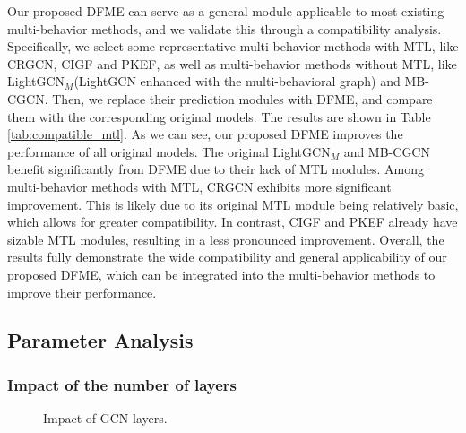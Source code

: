 Our proposed DFME can serve as a general module applicable to most existing multi-behavior methods, and we validate this through a compatibility analysis. Specifically, we select some representative multi-behavior methods with MTL, like CRGCN, CIGF and PKEF, as well as multi-behavior methods without MTL, like LightGCN$_M$(LightGCN enhanced with the multi-behavioral graph) and MB-CGCN. Then, we replace their prediction modules with DFME, and compare them with the corresponding original models. The results are shown in Table \ref{tab:compatible_mtl}. As we can see, our proposed DFME improves the performance of all original models. The original LightGCN$_M$ and MB-CGCN benefit significantly from DFME due to their lack of MTL modules. Among multi-behavior methods with MTL, CRGCN exhibits more significant improvement. This is likely due to its original MTL module being relatively basic, which allows for greater compatibility. In contrast, CIGF and PKEF already have sizable MTL modules, resulting in a less pronounced improvement. Overall, the results fully demonstrate the wide compatibility and general applicability of our proposed DFME, which can be integrated into the multi-behavior methods to improve their performance. 

\subsection{Parameter Analysis}
\label{hyper}
\subsubsection{Impact of the number of layers}

\begin{figure}[t]
	\setlength{\belowcaptionskip}{0cm}
	\setlength{\abovecaptionskip}{0cm}
	\caption{Impact of GCN layers.}
        \vspace{-3mm}
	\label{fig:layer}
\end{figure}

